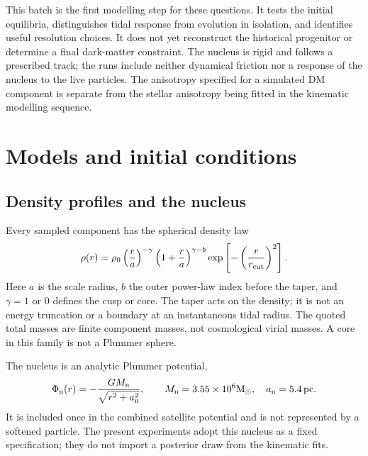 \documentclass[11pt,a4paper]{article}
\newcommand{\Msun}{\mathrm{M}_{\odot}}
\newcommand{\pc}{\,\mathrm{pc}}
\begin{document}
This batch is the first modelling step for these questions. It tests the
initial equilibria, distinguishes tidal response from evolution in isolation,
and identifies useful resolution choices. It does not yet reconstruct the
historical progenitor or determine a final dark-matter constraint. The nucleus
is rigid and follows a prescribed track; the runs include neither dynamical
friction nor a response of the nucleus to the live particles. The anisotropy
specified for a simulated DM component is separate from the stellar anisotropy
being fitted in the kinematic modelling sequence.

\section{Models and initial conditions}

\subsection{Density profiles and the nucleus}

Every sampled component has the spherical density law
\begin{equation}
 \rho(r)=\rho_0\left(\frac{r}{a}\right)^{-\gamma}
 \left(1+\frac{r}{a}\right)^{\gamma-b}
 \exp\left[-\left(\frac{r}{r_{\rm cut}}\right)^2\right].
 \label{eq:density}
\end{equation}
Here $a$ is the scale radius, $b$ the outer power-law index before the taper,
and $\gamma=1$ or $0$ defines the cusp or core. The taper acts on the density;
it is not an energy truncation or a boundary at an instantaneous tidal radius.
The quoted total masses are finite component masses, not cosmological virial
masses. A core in this family is not a Plummer sphere.

The nucleus is an analytic Plummer potential,
\begin{equation}
 \Phi_{\rm n}(r)=-\frac{G M_{\rm n}}{\sqrt{r^2+a_{\rm n}^2}},\qquad
 M_{\rm n}=3.55\times10^6\Msun,\quad a_{\rm n}=5.4\pc .
 \label{eq:nucleus}
\end{equation}
It is included once in the combined satellite potential and is not represented
by a softened particle. The present experiments adopt this nucleus as a fixed
specification; they do not import a posterior draw from the kinematic fits.
\end{document}
